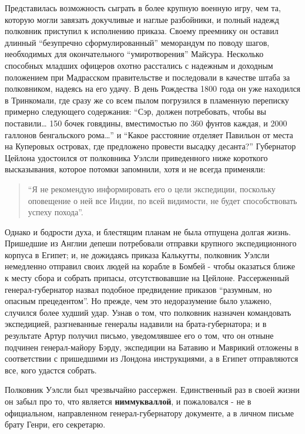 \documentclass[
  oneside,
  12pt,
  titlepage]{book}
\begin{document}
Представилась возможность сыграть в более крупную военную игру, чем та, которую могли завязать докучливые и наглые разбойники, и полный надежд полковник приступил к исполнению приказа. Своему преемнику он оставил длинный ``безупречно сформулированный'' меморандум по поводу шагов, необходимых для окончательного ``умиротворения'' Майсура. Несколько способных младших офицеров охотно расстались с надежным и доходным положением при Мадрасском правительстве и последовали в качестве штаба за полковником, надеясь на его удачу. В день Рождества 1800 года он уже находился в Тринкомали, где сразу же со всем пылом погрузился в пламенную переписку примерно следующего содержания: ``Сэр, должен потребовать, чтобы вы поставили\ldots{} 150 бочек говядины, вместимостью по 360 фунтов каждая, и 2000 галлонов бенгальского рома\ldots{}'' и ``Какое расстояние отделяет Павильон от места на Куперовых островах, где предложено провести высадку десанта?'' Губернатор Цейлона удостоился от полковника Уэлсли приведенного ниже короткого высказывания, которое потомки запомнили, хотя и не всегда применяли:

\begin{quote}
``Я не рекомендую информировать его о цели экспедиции, поскольку оповещение о ней все Индии, по всей видимости, не будет способствовать успеху похода''.
\end{quote}

Однако и бодрости духа, и блестящим планам не была отпущена долгая жизнь. Пришедшие из Англии депеши потребовали отправки крупного экспедиционного корпуса в Египет; и, не дожидаясь приказа Калькутты, полковник Уэлсли немедленно отправил своих людей на корабле в Бомбей - чтобы оказаться ближе к месту сбора и собрать припасы, отсутствовавшие на Цейлоне. Рассерженный генерал-губернатор назвал подобное предвидение приказов ``разумным, но опасным прецедентом''. Но прежде, чем это недоразумение было улажено, случился более худший удар. Узнав о том, что полковник назначен командовать экспедицией, разгневанные генералы надавили на брата-губернатора; и в результате Артур получил письмо, уведомлявшее его о том, что он отныне подчинен генерал-майору Бэрду, экспедиции на Батавию и Маврикий отложены в соответствии с пришедшими из Лондона инструкциями, а в Египет отправляются все, кого удастся собрать.

Полковник Уэлсли был чрезвычайно рассержен. Единственный раз в своей жизни он забыл про то, что является \textbf{ниммукваллой}, и пожаловался - не в официальном, направленном генерал-губернатору документе, а в личном письме брату Генри, его секретарю.
\end{document}
